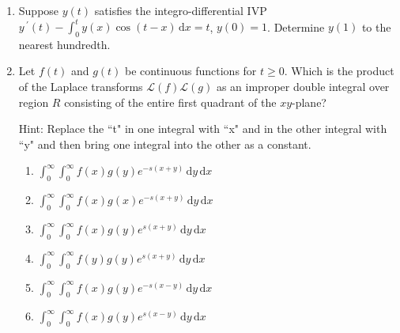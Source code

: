 \documentclass{ximera}
\begin{document}
\begin{enumerate}[label=(\arabic*)]


\item Suppose $y(t)$ satisfies the integro-differential IVP \\$\displaystyle y\,^{\prime}(t)-\int_0^t y(x)\cos{(t-x)}\,\mathrm{d}x=t$, $y(0)=1$.  Determine $y(1)$ to the nearest hundredth.








\newpage


\item Let $f(t)$ and $g(t)$ be continuous functions for $t\geq 0$.  Which is the product of the Laplace transforms $\mathcal{L}(f)\mathcal{L}(g)$ as an improper double integral over region $R$ consisting of the entire first quadrant of the $xy$-plane?  
    
     Hint:  Replace the ``t" in one integral with ``x" and in the other integral with ``y" and then bring one integral into the other as a constant.

\begin{enumerate}[label=(\alph*)]
\item $\displaystyle \int_0^{\infty}\int_0^{\infty}f(x)g(y)e^{-s(x+y)}\,\mathrm{d}y\,\mathrm{d}x$  %
\item $\displaystyle \int_0^{\infty}\int_0^{\infty}f(x)g(x)e^{-s(x+y)}\,\mathrm{d}y\,\mathrm{d}x$  
\item $\displaystyle \int_0^{\infty}\int_0^{\infty}f(x)g(y)e^{s(x+y)}\,\mathrm{d}y\,\mathrm{d}x$
\item $\displaystyle \int_0^{\infty}\int_0^{\infty}f(y)g(y)e^{s(x+y)}\,\mathrm{d}y\,\mathrm{d}x$
\item $\displaystyle \int_0^{\infty}\int_0^{\infty}f(x)g(y)e^{-s(x-y)}\,\mathrm{d}y\,\mathrm{d}x$
\item $\displaystyle \int_0^{\infty}\int_0^{\infty}f(x)g(y)e^{s(x-y)}\,\mathrm{d}y\,\mathrm{d}x$
\end{enumerate}


\end{enumerate}
\end{document}

